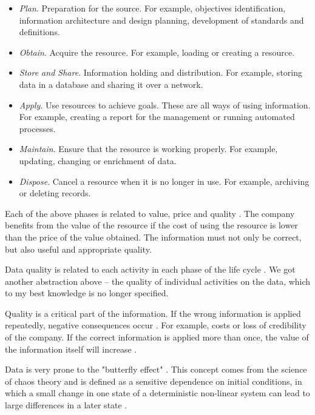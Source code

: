			\begin{itemize}
				\item \emph{Plan}. Preparation for the source. For example, objectives identification, information architecture and design planning, development of standards and definitions.
				\item \emph{Obtain}. Acquire the resource. For example, loading or creating a resource.
				\item \emph{Store and Share}. Information holding and distribution. For example, storing data in a database and sharing it over a network.
				\item \emph{Apply}. Use resources to achieve goals. These are all ways of using information. For example, creating a report for the management or running automated processes.
				\item \emph{Maintain}. Ensure that the resource is working properly. For example, updating, changing or enrichment of data.
				\item \emph{Dispose}. Cancel a resource when it is no longer in use. For example, archiving or deleting records.
			\end{itemize}
			
			Each of the above phases is related to value, price and quality \cite{McGilvray2008}. The company benefits from the value of the resource if the cost of using the resource is lower than the price of the value obtained. The information must not only be correct, but also useful and appropriate quality.
			
			Data quality is related to each activity in each phase of the life cycle \cite{McGilvray2008}. We got another abstraction above -- the quality of individual activities on the data, which to my best knowledge is no longer specified.
			
			Quality is a critical part of the information. If the wrong information is applied repeatedly, negative consequences occur \cite{McGilvray2008}. For example, costs or loss of credibility of the company. If the correct information is applied more than once, the value of the information itself will increase \cite{McGilvray2008}.
			
			Data is very prone to the "butterfly effect" \cite{Mahanti2018}. This concept comes from the science of chaos theory and is defined as a sensitive dependence on initial conditions, in which a small change in one state of a deterministic non-linear system can lead to large differences in a later state \cite{Mahanti2018}. 
			
